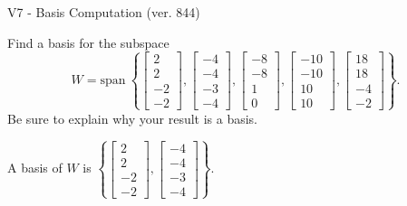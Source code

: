 \begin{exercise}
  \begin{exerciseTitle}V7 - Basis Computation (ver. 844)\end{exerciseTitle}
  \begin{exerciseStatement}
    Find a basis for the subspace 
\[W=\mathrm{span}\ \left\{\left[\begin{array}{r}
2 \\
2 \\
-2 \\
-2
\end{array}\right] , \left[\begin{array}{r}
-4 \\
-4 \\
-3 \\
-4
\end{array}\right] , \left[\begin{array}{r}
-8 \\
-8 \\
1 \\
0
\end{array}\right] , \left[\begin{array}{r}
-10 \\
-10 \\
10 \\
10
\end{array}\right] , \left[\begin{array}{r}
18 \\
18 \\
-4 \\
-2
\end{array}\right]\right\}.\]
 Be sure to explain why your result is a basis.


  \end{exerciseStatement}
  \begin{exerciseAnswer}
   A basis of \(W\) is  \(\left\{\left[\begin{array}{r}
2 \\
2 \\
-2 \\
-2
\end{array}\right] , \left[\begin{array}{r}
-4 \\
-4 \\
-3 \\
-4
\end{array}\right]\right\}\).
  


  \end{exerciseAnswer}
\end{exercise}